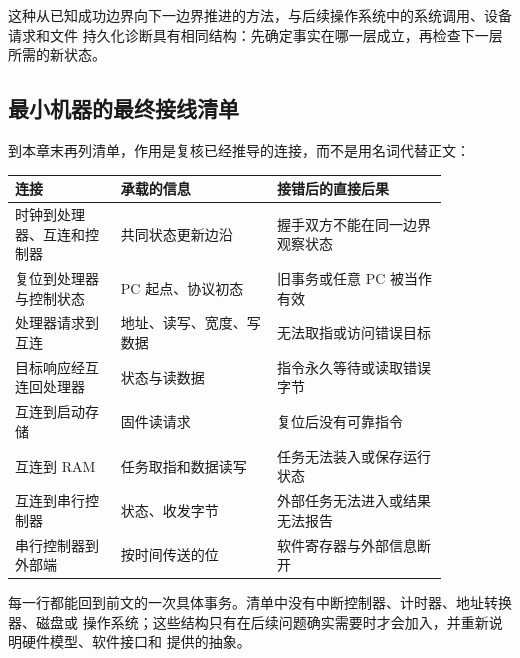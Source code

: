 这种从已知成功边界向下一边界推进的方法，与后续操作系统中的系统调用、设备请求和文件
持久化诊断具有相同结构：先确定事实在哪一层成立，再检查下一层所需的新状态。

\subsection{最小机器的最终接线清单}

到本章末再列清单，作用是复核已经推导的连接，而不是用名词代替正文：

\begin{longtable}{|L{0.21\linewidth}|L{0.31\linewidth}|L{0.34\linewidth}|}
\hline
{}
连接 & 承载的信息 & 接错后的直接后果 \\ \hline
时钟到处理器、互连和控制器 & 共同状态更新边沿 & 握手双方不能在同一边界观察状态 \\ \hline
复位到处理器与控制状态 & PC 起点、协议初态 & 旧事务或任意 PC 被当作有效 \\ \hline
处理器请求到互连 & 地址、读写、宽度、写数据 & 无法取指或访问错误目标 \\ \hline
目标响应经互连回处理器 & 状态与读数据 & 指令永久等待或读取错误字节 \\ \hline
互连到启动存储 & 固件读请求 & 复位后没有可靠指令 \\ \hline
互连到 RAM & 任务取指和数据读写 & 任务无法装入或保存运行状态 \\ \hline
互连到串行控制器 & 状态、收发字节 & 外部任务无法进入或结果无法报告 \\ \hline
串行控制器到外部端 & 按时间传送的位 & 软件寄存器与外部信息断开 \\ \hline
\end{longtable}

每一行都能回到前文的一次具体事务。清单中没有中断控制器、计时器、地址转换器、磁盘或
操作系统；这些结构只有在后续问题确实需要时才会加入，并重新说明硬件模型、软件接口和
提供的抽象。
